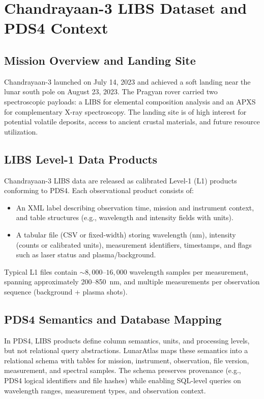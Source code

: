 \documentclass[12pt,a4paper]{article}
\begin{document}
\section{Chandrayaan-3 LIBS Dataset and PDS4 Context}
\label{sec:data}

\subsection{Mission Overview and Landing Site}

Chandrayaan-3 launched on July 14, 2023 and achieved a soft landing near the lunar south pole on August 23, 2023. The Pragyan rover carried two spectroscopic payloads: a LIBS for elemental composition analysis and an APXS for complementary X-ray spectroscopy. The landing site is of high interest for potential volatile deposits, access to ancient crustal materials, and future resource utilization.

\subsection{LIBS Level-1 Data Products}

Chandrayaan-3 LIBS data are released as calibrated Level-1 (L1) products conforming to PDS4. Each observational product consists of:

\begin{itemize}[nosep]
  \item An XML label describing observation time, mission and instrument context, and table structures (e.g., wavelength and intensity fields with units).
  \item A tabular file (CSV or fixed-width) storing wavelength (\si{nm}), intensity (counts or calibrated units), measurement identifiers, timestamps, and flags such as laser status and plasma/background.
\end{itemize}

Typical L1 files contain \(\sim 8{,}000\)--\(16{,}000\) wavelength samples per measurement, spanning approximately 200--850~nm, and multiple measurements per observation sequence (background + plasma shots).

\subsection{PDS4 Semantics and Database Mapping}

In PDS4, LIBS products define column semantics, units, and processing levels, but not relational query abstractions. LunarAtlas maps these semantics into a relational schema with tables for mission, instrument, observation, file version, measurement, and spectral samples. The schema preserves provenance (e.g., PDS4 logical identifiers and file hashes) while enabling SQL-level queries on wavelength ranges, measurement types, and observation context.
\end{document}
